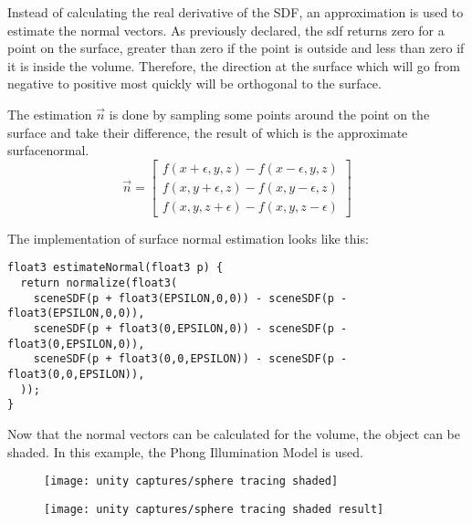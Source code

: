 \noindent
Instead of calculating the real derivative of the SDF, an approximation is used to estimate the normal vectors.
As previously declared, the \gls{sdf} returns zero for a point on the surface, greater than zero if the point is outside and less than zero if it is inside the volume. 
Therefore, the direction at the surface which will go from negative to positive most quickly will be orthogonal to the surface.
\\
\begin{minipage}{\linewidth}
The estimation $\overrightarrow{n}$ is done by sampling some points around the point on the surface and take their difference, the result of which is the approximate \gls{surfacenormal}.
$$
\overrightarrow{n} = 
\left[
    \begin{matrix}
        f(x + \epsilon, y, z) - f(x - \epsilon, y, z) \\
        f(x, y + \epsilon, z) - f(x, y - \epsilon, z) \\
        f(x, y, z + \epsilon) - f(x, y, z - \epsilon)
       \end{matrix}
\right]
$$

\noindent
The implementation of surface normal estimation looks like this:

\begin{lstlisting}[language=HLSL, caption=Implementation of surface normal estimation., label=lst:shader:surfacenormal]
float3 estimateNormal(float3 p) {
  return normalize(float3(
    sceneSDF(p + float3(EPSILON,0,0)) - sceneSDF(p - float3(EPSILON,0,0)),
    sceneSDF(p + float3(0,EPSILON,0)) - sceneSDF(p - float3(0,EPSILON,0)),
    sceneSDF(p + float3(0,0,EPSILON)) - sceneSDF(p - float3(0,0,EPSILON)),
  ));
}
\end{lstlisting}
\end{minipage}

\noindent
Now that the normal vectors can be calculated for the volume, the object can be shaded. In this example, the Phong Illumination Model \cite{online:phong} is used. 

\begin{figure}[H]
    \centering
        \begin{minipage}{0.47\linewidth}
            \texttt{[image: unity captures/sphere tracing shaded]}
            \label{img:captures:spheretracing}
        \end{minipage}
    \hfill
        \begin{minipage}{0.47\linewidth}
            \texttt{[image: unity captures/sphere tracing shaded result]}
            \label{img:captures:spheretracing_rendered}
        \end{minipage}
\end{figure}

